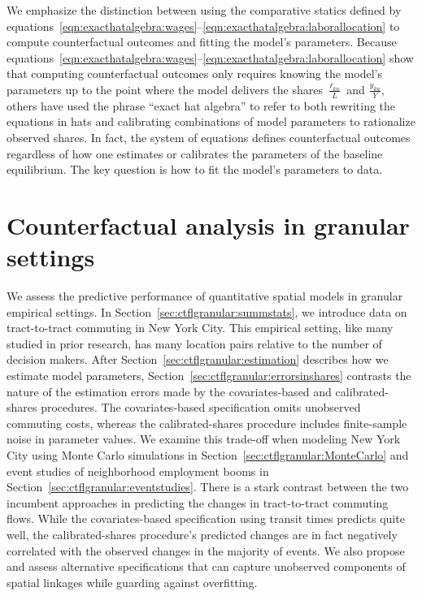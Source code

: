 \documentclass[11pt]{article}
\theoremstyle{definition}
\begin{document}
We emphasize the distinction between using the comparative statics defined by equations~\eqref{eqn:exacthatalgebra:wages}--\eqref{eqn:exacthatalgebra:laborallocation} to compute counterfactual outcomes and fitting the model's parameters.
Because equations~\eqref{eqn:exacthatalgebra:wages}--\eqref{eqn:exacthatalgebra:laborallocation} show that 
computing counterfactual outcomes only requires
knowing the model's parameters up to the point where
the model delivers the shares $\frac{\ell_{kn}}{L}$ and $\frac{y_{kn}}{Y}$,
others have used the phrase ``exact hat algebra'' to refer to both
rewriting the equations in hats
and 
calibrating combinations of model parameters to rationalize observed shares.
In fact,
the system of equations defines counterfactual outcomes regardless of how one estimates or calibrates the parameters of the baseline equilibrium.
The key question is how to fit the model's parameters to data.
\section{Counterfactual analysis in granular settings}\label{sec:ctflgranular}

We assess the predictive performance of quantitative spatial models in granular empirical settings.
In Section~\ref{sec:ctflgranular:summstats},
we introduce data on tract-to-tract commuting in New York City.
This empirical setting, like many studied in prior research, has many location pairs relative to the number of decision makers.
After Section~\ref{sec:ctflgranular:estimation} describes how we estimate model parameters,
Section~\ref{sec:ctflgranular:errorsinshares} contrasts the nature of the estimation errors
made by the covariates-based and calibrated-shares procedures.
The covariates-based specification omits unobserved commuting costs,
whereas the calibrated-shares procedure includes finite-sample noise in parameter values.
We examine this trade-off when modeling New York City using
Monte Carlo simulations in Section~\ref{sec:ctflgranular:MonteCarlo}
and
event studies of neighborhood employment booms in Section~\ref{sec:ctflgranular:eventstudies}.
There is a stark contrast between the two incumbent approaches in predicting the changes in tract-to-tract commuting flows.
While the covariates-based specification using transit times predicts quite well,
the calibrated-shares procedure's predicted changes are in fact negatively correlated with the observed changes in the majority of events.
We also propose and assess alternative specifications that can capture unobserved components of spatial linkages while guarding against overfitting.
\end{document}
